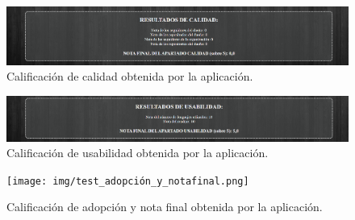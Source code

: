 \documentclass[a4paper, 12pt]{book}
\begin{document}
\begin{figure}
    \centering
    \includegraphics[width=1\textwidth, keepaspectratio]{img/test_calidad.png}
    \caption{Calificación de calidad obtenida por la aplicación.}\label{fig:test_calidad}
\end{figure}
\begin{figure}
    \centering
    \includegraphics[width=1\textwidth, keepaspectratio]{img/test_usabilidad.png}
    \caption{Calificación de usabilidad obtenida por la aplicación.}\label{fig:test_usabilidad}
\end{figure}
\begin{figure}
    \centering
    \texttt{[image: img/test\_adopción\_y\_notafinal.png]}
    \caption{Calificación de adopción y nota final obtenida por la aplicación.}\label{fig:test_adopción_y_notafinal}
\end{figure}
\end{document}
